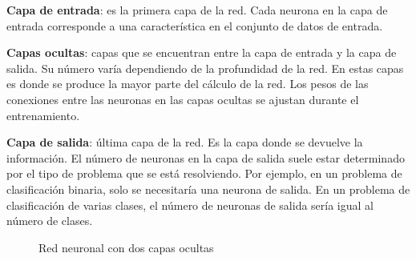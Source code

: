 \textbf{Capa de entrada}: es la primera capa de la red. Cada neurona en la capa de entrada corresponde a una característica en el conjunto de datos de entrada.

\textbf{Capas ocultas}: capas que se encuentran entre la capa de entrada y la capa de salida. Su número varía dependiendo de la profundidad de la red. 
En estas capas es donde se produce la mayor parte del cálculo de la red. Los pesos de las conexiones entre las neuronas en las capas ocultas se ajustan durante el entrenamiento.

\textbf{Capa de salida}: última capa de la red. Es la capa donde se devuelve la información. El número de neuronas en la capa de salida suele estar determinado por el tipo de problema que se está resolviendo. Por ejemplo, en un problema de clasificación binaria, solo se necesitaría una neurona de salida. En un problema de clasificación de varias clases, el número de neuronas de salida sería igual al número de clases.

\begin{figure}
\centering
{}
\caption{Red neuronal con dos capas ocultas}
\end{figure}

